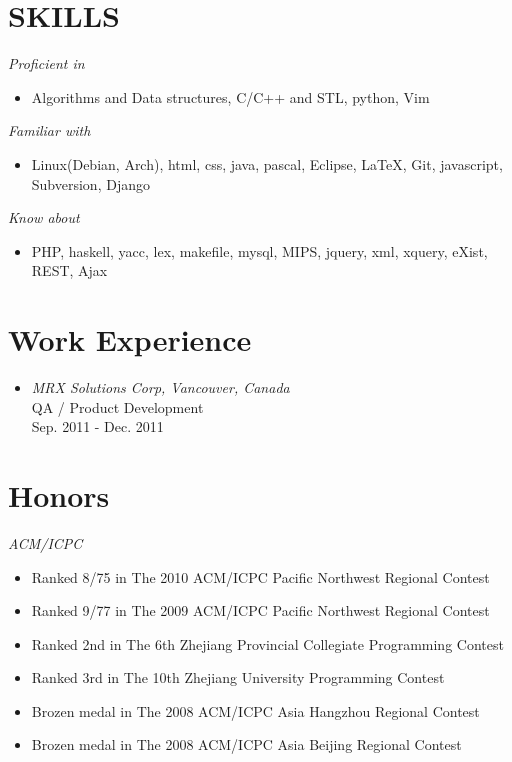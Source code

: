 \documentclass[line,margin]{res}
\begin{document}
\address{7309 Montclair, Burnaby, B.C. Canada V5A 3J2}
\address{+1-778-862-3661 \\zmin@sfu.ca}
\begin{resume}
\section{SKILLS} 
	{\sl Proficient in } 
						\begin{itemize}
						\item Algorithms and Data structures, C/C++ and STL, python, Vim
						\end{itemize}
    {\sl Familiar with }
						\begin{itemize}
						\item Linux(Debian, Arch), html, css, java, pascal, Eclipse, \LaTeX, Git, javascript, Subversion, Django
						\end{itemize}
 	{\sl Know about } 
					\begin{itemize}
					\item PHP, haskell, yacc, lex, makefile, mysql, MIPS, jquery, xml, xquery, eXist, REST, Ajax
					\end{itemize}

\section{Work Experience}
\begin{itemize}
\item[] {\sl MRX Solutions Corp, Vancouver, Canada}\\
 QA / Product Development \\
Sep. 2011 - Dec. 2011
\end{itemize}


\section{Honors}
{\sl ACM/ICPC}
\begin{itemize}
\item Ranked 8/75 in The 2010 ACM/ICPC Pacific Northwest Regional Contest	
\item Ranked 9/77 in The 2009 ACM/ICPC Pacific Northwest Regional Contest	
\item Ranked 2nd in The 6th Zhejiang Provincial Collegiate Programming Contest 
\item Ranked 3rd in The 10th Zhejiang University Programming Contest 
\item Brozen medal in The 2008 ACM/ICPC Asia Hangzhou Regional Contest 
\item Brozen medal in The 2008 ACM/ICPC Asia Beijing Regional Contest   


\end{itemize}
\end{resume}
\end{document}
